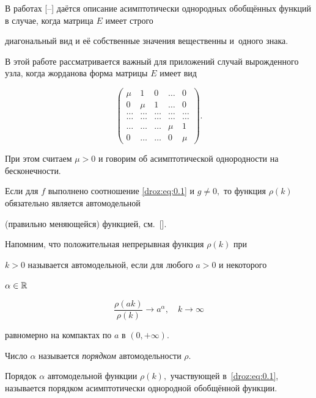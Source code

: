В работах [--] даётся описание асимптотически однородных обобщённых функций в случае, когда матрица $E$ имеет строго

диагональный вид и её собственные значения вещественны и~одного знака.

В этой работе рассматривается важный для приложений  случай вырожденного узла, когда жорданова форма матрицы $E$ имеет вид

\begin{equation}

\begin{pmatrix}

\mu& 1 & 0 & \dots & 0\\

0 & \mu & 1 & \dots & 0\\

\dots & \dots & \dots & \dots & \dots \\

\dots & \dots & \dots & \dots & \dots \\

\dots & \dots & \dots & \mu & 1 \\

0 & \dots &\dots & 0 & \mu

\end{pmatrix}.

\label{droz:eq:0.2}

\end{equation}

При этом считаем $\mu >0$ и говорим об асимптотической однородности на бесконечности.

Если для $f$ выполнено соотношение \eqref{droz:eq:0.1} и $g\not=0,$ то функция $\rho (k)$ обязательно является автомодельной

(правильно меняющейся) функцией, см.~[].

Напомним, что положительная непрерывная функция $\rho(k)$ при

$k>0$ называется автомодельной, если для любого $a>0$ и некоторого

$\alpha \in {\Bbb R}$

$$

\frac{\rho(ak)}{\rho (k)}\to a^{\alpha},\quad k\to \infty

$$

равномерно на компактах по $a$ в $(0,+\infty ).$

Число $\alpha$ называется {\it порядком\/} автомодельности $\rho$.

Порядок $\alpha$ автомодельной функции $\rho(k),$ участвующей в~\eqref{droz:eq:0.1}, называется порядком асимптотически однородной обобщённой функции. 

